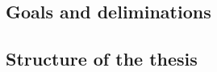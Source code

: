 \subsection{Goals and deliminations}

%
\begin{comment}
INSTRUCTIONS FOR WRITING A MASTER'S THESIS

Express the goals for the work, include also the delimitations. This way the reader knows
when the results are valid and she can place the work in a proper framework and scope. 
It is also important to say, what is not done during the work for the thesis. Then the
thesis will show how the goals are met. In the thesis this subsection occupies from 1 to 2
pages.
\end{comment}

\subsection{Structure of the thesis}

